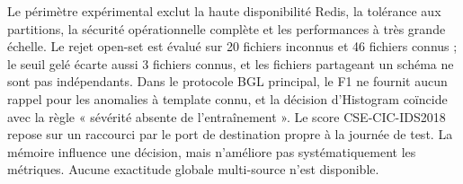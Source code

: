 
Le périmètre expérimental exclut la haute disponibilité Redis, la tolérance aux partitions, la sécurité opérationnelle complète et les performances à très grande échelle. Le rejet open-set est évalué sur 20 fichiers inconnus et 46 fichiers connus ; le seuil gelé écarte aussi 3 fichiers connus, et les fichiers partageant un schéma ne sont pas indépendants. Dans le protocole BGL principal, le F1 ne fournit aucun rappel pour les anomalies à template connu, et la décision d'Histogram coïncide avec la règle « sévérité absente de l'entraînement ». Le score CSE-CIC-IDS2018 repose sur un raccourci par le port de destination propre à la journée de test. La mémoire influence une décision, mais n'améliore pas systématiquement les métriques. Aucune exactitude globale multi-source n'est disponible.
